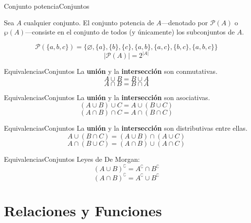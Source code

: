\documentclass[spanish, c]{beamer}
\begin{document}
\begin{frame}{Conjunto potencia}{Conjuntos}
    \begin{definition}
        Sea $A$ cualquier conjunto. El \alert{conjunto potencia} de $A$---denotado por $\mathscr{P}(A)$ o $\wp(A)$---consiste en el conjunto de todos (y únicamente) los subconjuntos de $A$.
    \end{definition}
    \pause
    \bigskip
    \[\mathscr{P}(\{a,b,c\}) = \{\varnothing, \{a\}, \{b\}, \{c\}, \{a,b\}, \{a,c\}, \{b,c\}, \{a,b,c\}\}\] \pause
    \bigskip
    \[|\mathscr{P}(A)| = 2^{|A|}\]
\end{frame}

\begin{frame}{Equivalencias}{Conjuntos}
    \label{fr:equivalence}
    La \textbf{unión} y la \textbf{intersección} son \alert{conmutativas}. \pause
    \bigskip
    \[A \cup B = B \cup A\] \pause
    \bigskip
    \[A \cap B = B \cap A\]
\end{frame}

\begin{frame}{Equivalencias}{Conjuntos}
    La \textbf{unión} y la \textbf{intersección} son \alert{asociativas}. \pause
    \bigskip
    \[(A \cup B) \cup C = A \cup (B \cup C)\] \pause
    \bigskip
    \[(A \cap B) \cap C = A \cap (B \cap C)\]
\end{frame}

\begin{frame}{Equivalencias}{Conjuntos}
    La \textbf{unión} y la \textbf{intersección} son \alert{distributivas} entre ellas. \pause
    \bigskip
    \[A \cup (B \cap C) = (A \cup B) \cap (A \cup C)\] \pause
    \bigskip
    \[A \cap (B \cup C) = (A \cap B) \cup (A \cap C)\]
\end{frame}

\begin{frame}{Equivalencias}{Conjuntos}
    Leyes de \alert{De Morgan}: \pause
    \bigskip
    \[(A \cup B)^\complement = A^\complement \cap B^\complement\] \pause
    \[(A \cap B)^\complement = A^\complement \cup B^\complement\]
    \bigskip
    \hyperlink{fr:logicequiv}{}
\end{frame}

\section{Relaciones y Funciones}
\label{sec:relfunc}
\end{document}
